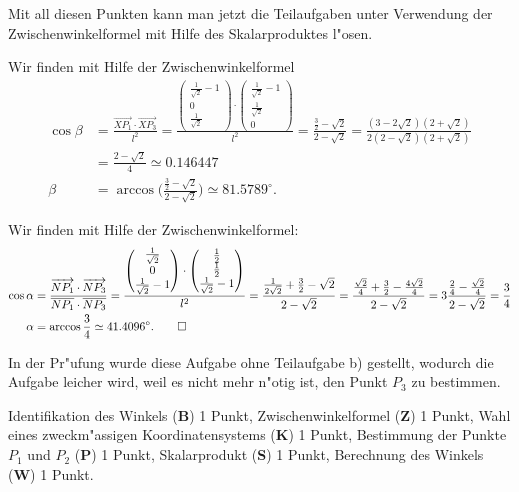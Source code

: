 \begin{loesung}
Mit all diesen Punkten kann man jetzt die Teilaufgaben unter Verwendung
der Zwischenwinkelformel mit Hilfe des Skalarproduktes l"osen.
\begin{teilaufgaben}
\item
Wir finden mit Hilfe der Zwischenwinkelformel
\begin{align*}
\cos\beta
&=
\frac{\overrightarrow{XP_1}\cdot\overrightarrow{XP_3}}{l^2}
=
\frac{
\begin{pmatrix}\frac1{\sqrt{2}}-1\\0\\\frac1{\sqrt{2}}\end{pmatrix}
\cdot
\begin{pmatrix}\frac1{\sqrt{2}}-1\\\frac1{\sqrt{2}}\\0\end{pmatrix}
}{l^2}
=
\frac{\frac32-\sqrt{2}}{2-\sqrt{2}}
=
\frac{(3-2\sqrt{2})(2+\sqrt{2})}{2(2-\sqrt{2})(2+\sqrt{2})}
\\
&=
\frac{2-\sqrt{2}}{4}
\simeq
0.146447
\\
\beta
&=
\arccos \biggl(\frac{\frac32-\sqrt{2}}{2-\sqrt{2}}\biggr)
\simeq81.5789^\circ.
\end{align*}
\item
Wir finden mit Hilfe der Zwischenwinkelformel:
\begin{align*}
\cos\alpha
&=
\frac{\overrightarrow{NP_1}\cdot \overrightarrow{NP_3}}{
\overline{NP_1}\cdot\overline{NP_3}
}
=\frac{
\begin{pmatrix}\frac1{\sqrt{2}}\\0\\\frac1{\sqrt{2}}-1\end{pmatrix}
\cdot
\begin{pmatrix}\frac12\\\frac12\\\frac1{\sqrt{2}}-1\end{pmatrix}
}{l^2}
=
\frac{\frac1{2\sqrt{2}}+\frac32-\sqrt{2}}{2-\sqrt{2}}
=
\frac{\frac{\sqrt{2}}{4}+\frac32-\frac{4\sqrt{2}}{4}}{2-\sqrt{2}}
=
3 \frac{\frac24-\frac{\sqrt{2}}4}{2-\sqrt{2}}
=
\frac34
\\
\alpha
&=
\arccos\frac34\simeq41.4096^\circ.
\qedhere
\end{align*}
\end{teilaufgaben}
\end{loesung}

\begin{diskussion}
In der Pr"ufung wurde diese Aufgabe ohne Teilaufgabe b) gestellt, wodurch
die Aufgabe leicher wird, weil es nicht mehr n"otig ist, den Punkt
$P_3$ zu bestimmen.
\end{diskussion}

\begin{bewertung}
Identifikation des Winkels ({\bf B}) 1 Punkt,
Zwischenwinkelformel ({\bf Z}) 1 Punkt,
Wahl eines zweckm"assigen Koordinatensystems ({\bf K}) 1 Punkt,
Bestimmung der Punkte $P_1$ und $P_2$ ({\bf P}) 1 Punkt,
Skalarprodukt ({\bf S}) 1 Punkt,
Berechnung des Winkels ({\bf W}) 1 Punkt.
\end{bewertung}


